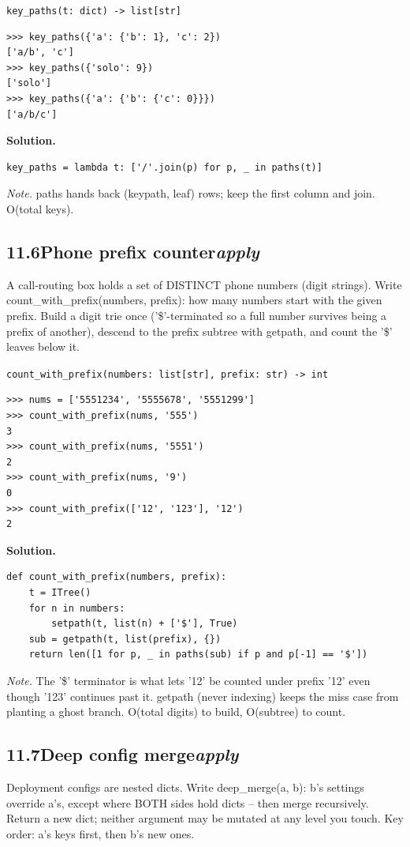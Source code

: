 \documentclass[10pt,letterpaper]{book}
\begin{document}
\noindent\texttt{key\_paths(t: dict) -> list[str]}
\begin{lstlisting}[style=ex]
>>> key_paths({'a': {'b': 1}, 'c': 2})
['a/b', 'c']
>>> key_paths({'solo': 9})
['solo']
>>> key_paths({'a': {'b': {'c': 0}}})
['a/b/c']
\end{lstlisting}
\noindent\textbf{Solution.}
\begin{lstlisting}[style=code]
key_paths = lambda t: ['/'.join(p) for p, _ in paths(t)]
\end{lstlisting}
\noindent\textit{Note.} paths hands back (keypath, leaf) rows; keep the first column and join. O(total keys).

\subsection*{11.6\quad Phone prefix counter\hfill\textnormal{\textit{apply}}}
A call-routing box holds a set of DISTINCT phone numbers (digit strings). Write count\_with\_prefix(numbers, prefix): how many numbers start with the given prefix. Build a digit trie once ('\$'-terminated so a full number survives being a prefix of another), descend to the prefix subtree with getpath, and count the '\$' leaves below it.

\noindent\texttt{count\_with\_prefix(numbers: list[str], prefix: str) -> int}
\begin{lstlisting}[style=ex]
>>> nums = ['5551234', '5555678', '5551299']
>>> count_with_prefix(nums, '555')
3
>>> count_with_prefix(nums, '5551')
2
>>> count_with_prefix(nums, '9')
0
>>> count_with_prefix(['12', '123'], '12')
2
\end{lstlisting}
\noindent\textbf{Solution.}
\begin{lstlisting}[style=code]
def count_with_prefix(numbers, prefix):
    t = ITree()
    for n in numbers:
        setpath(t, list(n) + ['$'], True)
    sub = getpath(t, list(prefix), {})
    return len([1 for p, _ in paths(sub) if p and p[-1] == '$'])
\end{lstlisting}
\noindent\textit{Note.} The '\$' terminator is what lets '12' be counted under prefix '12' even though '123' continues past it. getpath (never indexing) keeps the miss case from planting a ghost branch. O(total digits) to build, O(subtree) to count.

\subsection*{11.7\quad Deep config merge\hfill\textnormal{\textit{apply}}}
Deployment configs are nested dicts. Write deep\_merge(a, b): b's settings override a's, except where BOTH sides hold dicts -- then merge recursively. Return a new dict; neither argument may be mutated at any level you touch. Key order: a's keys first, then b's new ones.
\end{document}

